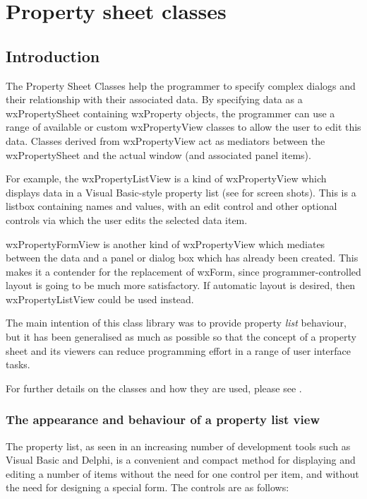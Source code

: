 \chapter{Property sheet classes}\label{proplist}

\section{Introduction}\label{proplistintro}

The Property Sheet Classes help the programmer to specify complex dialogs and
their relationship with their associated data. By specifying data as a
wxPropertySheet containing wxProperty objects, the programmer can use
a range of available or custom wxPropertyView classes to allow the user to
edit this data. Classes derived from wxPropertyView act as mediators between the
wxPropertySheet and the actual window (and associated panel items).

For example, the wxPropertyListView is a kind of wxPropertyView which displays
data in a Visual Basic-style property list (see  for
screen shots). This is a listbox containing names and values, with
an edit control and other optional controls via which the user edits the selected
data item.

wxPropertyFormView is another kind of wxPropertyView which mediates between
the data and a panel or dialog box which has already been created. This makes it a contender for
the replacement of wxForm, since programmer-controlled layout is going to be much more
satisfactory. If automatic layout is desired, then wxPropertyListView could be used instead.

The main intention of this class library was to provide property {\it list} behaviour, but
it has been generalised as much as possible so that the concept of a property sheet and its viewers
can reduce programming effort in a range of user interface tasks.

For further details on the classes and how they are used, please see .

\subsection{The appearance and behaviour of a property list view}\label{proplistappearance}

The property list, as seen in an increasing number of development tools
such as Visual Basic and Delphi, is a convenient and compact method for
displaying and editing a number of items without the need for one
control per item, and without the need for designing a special form. The
controls are as follows:

